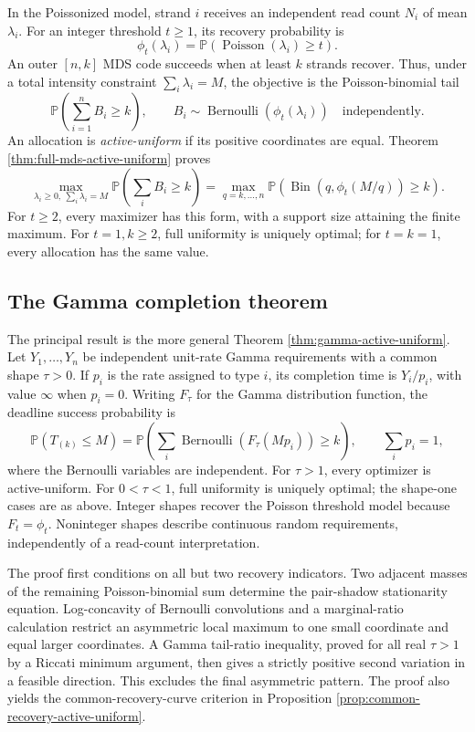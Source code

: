 \documentclass[11pt]{article}
\theoremstyle{definition}
\theoremstyle{remark}
\DeclareMathOperator{\Poisson}{Poisson}
\DeclareMathOperator{\Bernoulli}{Bernoulli}
\DeclareMathOperator{\Bin}{Bin}
\newcommand{\Pbb}{\mathbb P}
\newcommand{\1}{\mathbf 1}
\begin{document}
In the Poissonized model, strand \(i\) receives an independent read count \(N_i\) of mean \(\lambda_i\). For an integer threshold \(t\ge1\), its recovery probability is
\[
 \phi_t(\lambda_i)=\Pbb(\Poisson(\lambda_i)\ge t).
\]
An outer \([n,k]\) MDS code succeeds when at least \(k\) strands recover. Thus, under a total intensity constraint \(\sum_i\lambda_i=M\), the objective is the Poisson-binomial tail
\[
 \Pbb\!\left(\sum_{i=1}^n B_i\ge k\right),
 \qquad B_i\sim\Bernoulli(\phi_t(\lambda_i))
 \quad\text{independently}.
\]
An allocation is \emph{active-uniform} if its positive coordinates are equal. Theorem \ref{thm:full-mds-active-uniform} proves
\[
 \max_{\lambda_i\ge0,\ \sum_i\lambda_i=M}
 \Pbb\!\left(\sum_i B_i\ge k\right)
 =\max_{q=k,\ldots,n}
 \Pbb\!\left(\Bin(q,\phi_t(M/q))\ge k\right).
\]
For \(t\ge2\), every maximizer has this form, with a support size attaining the finite maximum. For \(t=1,k\ge2\), full uniformity is uniquely optimal; for \(t=k=1\), every allocation has the same value.

\subsection{The Gamma completion theorem}
The principal result is the more general Theorem \ref{thm:gamma-active-uniform}. Let \(Y_1,\ldots,Y_n\) be independent unit-rate Gamma requirements with a common shape \(\tau>0\). If \(p_i\) is the rate assigned to type \(i\), its completion time is \(Y_i/p_i\), with value \(\infty\) when \(p_i=0\). Writing \(F_\tau\) for the Gamma distribution function, the deadline success probability is
\[
 \Pbb(T_{(k)}\le M)
 =\Pbb\!\left(\sum_i\Bernoulli(F_\tau(Mp_i))\ge k\right),
 \qquad \sum_i p_i=1,
\]
where the Bernoulli variables are independent. For \(\tau>1\), every optimizer is active-uniform. For \(0<\tau<1\), full uniformity is uniquely optimal; the shape-one cases are as above. Integer shapes recover the Poisson threshold model because \(F_t=\phi_t\). Noninteger shapes describe continuous random requirements, independently of a read-count interpretation.

The proof first conditions on all but two recovery indicators. Two adjacent masses of the remaining Poisson-binomial sum determine the pair-shadow stationarity equation. Log-concavity of Bernoulli convolutions \cite{Liggett1997} and a marginal-ratio calculation restrict an asymmetric local maximum to one small coordinate and equal larger coordinates. A Gamma tail-ratio inequality, proved for all real \(\tau>1\) by a Riccati minimum argument, then gives a strictly positive second variation in a feasible direction. This excludes the final asymmetric pattern. The proof also yields the common-recovery-curve criterion in Proposition \ref{prop:common-recovery-active-uniform}.
\end{document}
